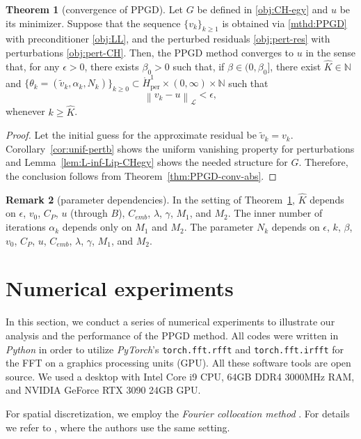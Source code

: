 \documentclass{amsart}
\newcommand{\Homz}{{\mathring{H}_{\mathrm{per}}^{1}}}
\newcommand{\vk}{{v_{k}}}
\newcommand{\LL}{\mathcal{L}}
\newcommand{\norm}[2]{\left\| #1 \right\| _{#2}}
\newcommand{\NN}{\mathbb{N}}
\newcommand{\s}{{\beta}}	%
\newcommand{\ins}{{\alpha}} %
\theoremstyle{definition}
\newtheorem{thm}{Theorem}[section]
\newtheorem{rmk}[thm]{Remark}
\begin{document}
\begin{thm}[convergence of PPGD]\label{thm:PPGD-conv}
  Let $G$ be defined in \eqref{obj:CH-egy} and $u$ be its minimizer. Suppose that the sequence $\{v_k\}_{k \geq 1}$ is obtained via \eqref{mthd:PPGD} with preconditioner \eqref{obj:LL}, and the perturbed residuals \eqref{obj:pert-res} with perturbations \eqref{obj:pert-CH}.
	Then, the PPGD method converges to $u$ in the sense that, for any $\epsilon>0$, there exists $\s_0 > 0$ such that, if $\s\in(0, \s_0]$, there exist $\hat K \in\NN$ and $\{\theta_k=(\tilde{v}_k,\ins_k, N_k)\}_{k\ge0}\subset \Homz \times (0,\infty)\times \NN$ such that
	\begin{equation}
		\norm{\vk-u}{\LL}< \epsilon,
	\end{equation} 
	whenever $k \ge \hat K$.
\end{thm}
\begin{proof}
	Let the initial guess for the approximate residual be $\tilde{v}_k=\vk$.  Corollary~\ref{cor:unif-pertb} shows the uniform vanishing property for perturbations and Lemma~\ref{lem:L-inf-Lip-CHegy} shows the needed structure for $G$. Therefore, the conclusion follows from Theorem~\ref{thm:PPGD-conv-abs}.
\end{proof} 

\begin{rmk}[parameter dependencies]
  In the setting of Theorem~\ref{thm:PPGD-conv}, $\hat K$ depends on $\epsilon$, $v_0$, $C_P$, $u$ (through $B$), $C_{emb}$, $\lambda$, $\gamma$, $M_1$, and $M_2$.
	The inner number of iterations $\ins_k$ depends only on $M_1$ and $M_2$.
	The parameter $N_k$ depends on $\epsilon$, $k$, $\s$, $v_0$, $C_P$, $u$, $C_{emb}$, $\lambda$, $\gamma$, $M_1$, and $M_2$.
\end{rmk}


\section{Numerical experiments}\label{sec:numerics}

In this section, we conduct a series of numerical experiments to illustrate our analysis and the performance of the PPGD method. All codes were written in \emph{Python} in order to utilize \emph{PyTorch}'s \texttt{torch.fft.rfft} and \texttt{torch.fft.irfft} for the FFT on a graphics processing units (GPU). All these software tools are open source. We used a desktop with Intel Core i9 CPU, 64GB DDR4 3000MHz RAM, and NVIDIA GeForce RTX 3090 24GB GPU.

For spatial discretization, we employ the \emph{Fourier collocation method} \cite{canuto2007spectral, shen2011spectral}. For details we refer to \cite[Section 6.2]{psw2021PAGD}, where the authors use the same setting.
\end{document}
